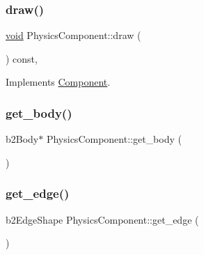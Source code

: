 \mbox{\label{classPhysicsComponent_afe1f99cac34411e9de43abebfcef0713}} 
\subsubsection{\texorpdfstring{draw()}{draw()}}
{\footnotesize\ttfamily \hyperlink{imgui__impl__opengl3__loader_8h_ac668e7cffd9e2e9cfee428b9b2f34fa7}{void} Physics\+Component\+::draw (\begin{DoxyParamCaption}{ }\end{DoxyParamCaption}) const\hspace{0.3cm}{\ttfamily [override]}, {\ttfamily [virtual]}}



Implements \hyperlink{classComponent_a8f45309003f02191f2bcc8864e8e9ecf}{Component}.

\mbox{\label{classPhysicsComponent_af8a05389feadfe76f83ae492f20d4644}} 
\subsubsection{\texorpdfstring{get\+\_\+body()}{get\_body()}}
{\footnotesize\ttfamily b2\+Body$\ast$ Physics\+Component\+::get\+\_\+body (\begin{DoxyParamCaption}{ }\end{DoxyParamCaption})\hspace{0.3cm}{\ttfamily [inline]}}

\mbox{\label{classPhysicsComponent_a0e5d7016877eb7a4e2d99367c3da7c9c}} 
\subsubsection{\texorpdfstring{get\+\_\+edge()}{get\_edge()}}
{\footnotesize\ttfamily b2\+Edge\+Shape Physics\+Component\+::get\+\_\+edge (\begin{DoxyParamCaption}{ }\end{DoxyParamCaption})\hspace{0.3cm}{\ttfamily [inline]}}

